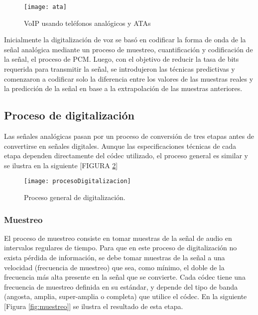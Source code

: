 	
		\begin{figure}[h]
			
			\texttt{[image: ata]}
			
			\caption{VoIP usando teléfonos analógicos y ATAs}
			
			\centering
			
			\label{fig:ata}
		\end{figure}
		
		
Inicialmente la digitalización de voz se basó en codificar la forma de onda de la señal analógica mediante un proceso de muestreo, cuantificación y codificación de la señal, el proceso de PCM. Luego, con el objetivo de reducir la tasa de bits requerida para transmitir la señal, se introdujeron las técnicas predictivas y comenzaron a codificar solo la diferencia entre los valores de las muestras reales y la predicción de la señal en base a la extrapolación de las muestras anteriores.

\subsection{Proceso de digitalización}

Las señales analógicas pasan por un proceso de conversión de tres etapas antes de convertirse en señales digitales. Aunque las especificaciones técnicas de cada etapa dependen directamente del códec utilizado, el proceso general es similar y se ilustra en la siguiente [FIGURA \ref{fig:procesoDigitalizacion}]

	\begin{figure}[h]
	
		\texttt{[image: procesoDigitalizacion]}
		
		\caption{Proceso general de digitalización.}
		
		\centering
		
		\label{fig:procesoDigitalizacion}
	\end{figure}

\subsubsection{Muestreo}
El proceso de muestreo consiste en tomar muestras de la señal de audio en intervalos regulares de tiempo. Para que en este proceso de digitalización no exista pérdida de información, se debe tomar muestras de la señal a una velocidad (frecuencia de muestreo) que sea, como mínimo, el doble \cite{nyquist} de la frecuencia más alta presente en la señal que se convierte. Cada códec tiene una frecuencia de muestreo definida en su estándar, y depende del tipo de banda (angosta, amplia, super-amplia o completa) que utilice el códec. En la siguiente [Figura \ref{fig:muestreo}] se ilustra el resultado de esta etapa.

